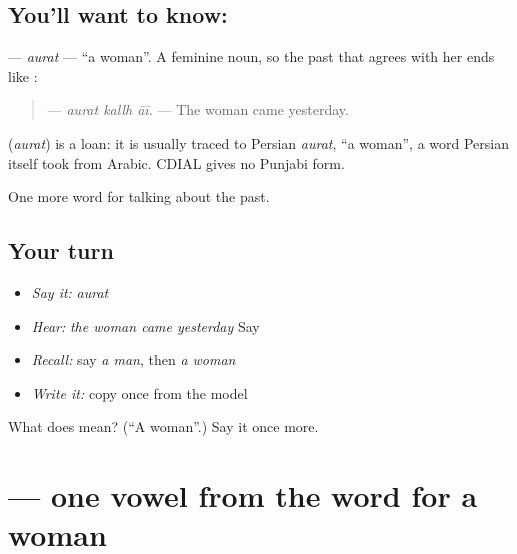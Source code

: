 \subsection*{You'll want to know: }
\textbf{} — \emph{aurat} — \textquotedblleft{}a woman\textquotedblright{}. A feminine noun, so the past that agrees with her ends like \textbf{}:

\begin{quote}
\textbf{  } — \emph{aurat kallh āī.} — The woman came yesterday.
\end{quote}

\begin{cousinweb}
\textbf{} (\emph{aurat}) is a loan: it is usually traced to Persian \emph{aurat}, \textquotedblleft{}a woman\textquotedblright{}, a word Persian itself took from Arabic. CDIAL gives no Punjabi form.
\end{cousinweb}

\begin{grammarlens}[title={What you've built}]
One more word for talking about the past.
\end{grammarlens}

\subsection*{Your turn}
\begin{itemize}
\raggedright
  \item \emph{Say it:} \emph{aurat}
  \item \emph{Hear:} \emph{the woman came yesterday} Say \textbf{  }
  \item \emph{Recall:} say \emph{a man}, then \emph{a woman}
  \item \emph{Write it:} copy \textbf{} once from the model
\end{itemize}

\begin{tcolorbox}[breakable,colback=teal!4,colframe=teal!35!black,title={Before you move on}]
What does \textbf{} mean? (\textquotedblleft{}A woman\textquotedblright{}.) Say it once more.
\end{tcolorbox}
\section[\texorpdfstring{\pa{ਔ} (au)}{ਔ (au)}]{ — one vowel from the word for a woman}

\label{lesson:PA-C217-au}



